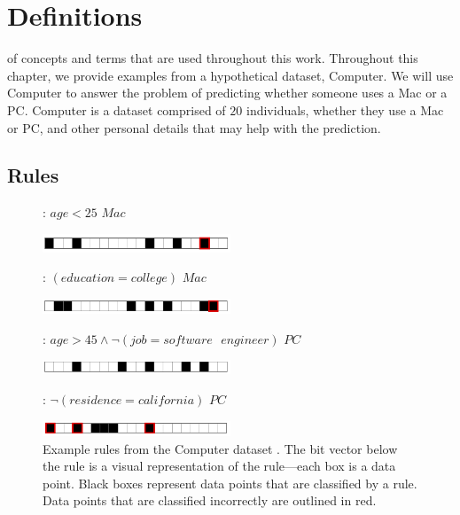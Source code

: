 \chapter{Definitions}\label{ch:definitions}
 of concepts and terms that are used throughout this work. 
Throughout this chapter, we provide examples from a hypothetical dataset, Computer.
We will use Computer to answer the problem of predicting whether someone uses a Mac or a PC.
Computer is a dataset comprised of $20$ individuals, whether they use a Mac or PC, and other personal details that may help with the prediction.

\section{Rules}

\begin{figure}[t!]
\begin{algorithmic}
\normalsize
{}: \bif $age < 25$ \bthen $Mac$\,

\begin{raggedleft}
\includegraphics[width=0.5\textwidth]{figs/rule_1_cap.png}
\end{raggedleft}
: \bif $(education=college)$ \bthen $Mac$\,

\begin{raggedleft}
\includegraphics[width=0.5\textwidth]{figs/rule_2_cap.png}
\end{raggedleft}
: \bif $age > 45 \wedge \neg (job=software\text{ }engineer)$ \bthen $PC$\,

\begin{raggedleft}
\includegraphics[width=0.5\textwidth]{figs/rule_3_cap.png}
\end{raggedleft}
: \bif $\neg (residence=california)$ \bthen $PC$\,

\begin{raggedleft}
\includegraphics[width=0.5\textwidth]{figs/rule_4_cap.png}
\end{raggedleft}
\end{algorithmic}
\caption{Example rules from the Computer dataset .
The bit vector below the rule is a visual representation of the rule---each box is a data point.
Black boxes represent data points that are classified by a rule.
Data points that are classified incorrectly are outlined in red.
}
\label{fig:rules}
\end{figure}

